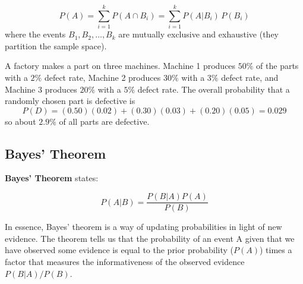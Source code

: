\documentclass[
  11pt,
  letterpaper,
  DIV=11,
  numbers=noendperiod,
  oneside,
  open=any]{scrreprt}
\begin{document}
\begin{bsformula}

\[P(A)=\sum_{i=1}^{k} P(A \cap B_i)=\sum_{i=1}^{k} P(A|B_i)\,P(B_i)\]
where the events \(B_1, B_2, \dots, B_k\) are mutually exclusive and
exhaustive (they partition the sample space).

\end{bsformula}

\begin{bsexample}[Example]

A factory makes a part on three machines. Machine 1 produces \(50\%\) of
the parts with a \(2\%\) defect rate, Machine 2 produces \(30\%\) with a
\(3\%\) defect rate, and Machine 3 produces \(20\%\) with a \(5\%\)
defect rate. The overall probability that a randomly chosen part is
defective is \[P(D)=(0.50)(0.02)+(0.30)(0.03)+(0.20)(0.05)=0.029\] so
about \(2.9\%\) of all parts are defective.

\end{bsexample}

\subsection*{Bayes' Theorem}\label{bayes-theorem}

\textbf{Bayes' Theorem} states:

\begin{bsformula}

\[P(A|B)= \frac{P(B|A)P(A)}{P(B)}\]

\end{bsformula}

In essence, Bayes' theorem is a way of updating probabilities in light
of new evidence. The theorem tells us that the probability of an event A
given that we have observed some evidence is equal to the prior
probability (\(P(A)\)) times a factor that measures the informativeness
of the observed evidence \(P(B|A)/P(B)\).
\end{document}
